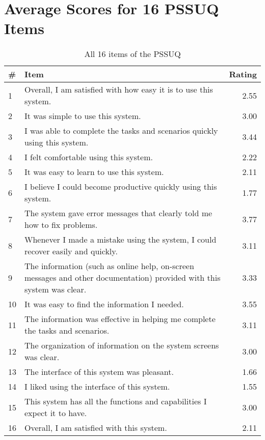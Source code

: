 
\section{Average Scores for 16 PSSUQ Items} \label{appendix:pssuq}

\begin{table}[h!]
\centering
\begin{tabular}{|l|p{8cm}|r|}
\hline
\rowcolor[HTML]{EFEFEF}
\# & {\bf Item} & {\bf Rating} \\ \hline
1 & Overall, I am satisfied with how easy it is to use this system. & 2.55 \\ \hline
2 & It was simple to use this system. & 3.00 \\ \hline
3 & I was able to complete the tasks and scenarios quickly using this system. & 3.44 \\ \hline
4 & I felt comfortable using this system. & 2.22 \\ \hline
5 & It was easy to learn to use this system. & 2.11 \\ \hline
6 & I believe I could become productive quickly using this system. & 1.77 \\ \hline
7 & The system gave error messages that clearly told me how to fix problems. & 3.77 \\ \hline
8 & Whenever I made a mistake using the system, I could recover easily and quickly. & 3.11 \\ \hline
9 & The information (such as online help, on-screen messages and other documentation) provided with this system was clear. & 3.33 \\ \hline
10 & It was easy to find the information I needed. & 3.55 \\ \hline
11 & The information was effective in helping me complete the tasks and scenarios. & 3.11 \\ \hline
12 & The organization of information on the system screens was clear. & 3.00 \\ \hline
13 & The interface of this system was pleasant. & 1.66 \\ \hline
14 & I liked using the interface of this system. & 1.55 \\ \hline
15 & This system has all the functions and capabilities I expect it to have. & 3.00 \\ \hline
16 & Overall, I am satisfied with this system. & 2.11 \\ \hline
\end{tabular}
\caption{All 16 items of the PSSUQ}
\label{table:pssuq-items}
\end{table}

